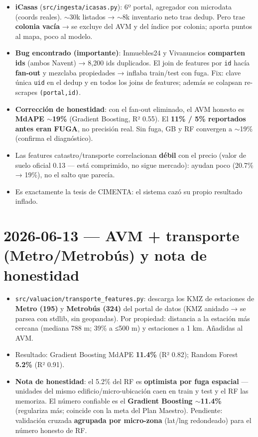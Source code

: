\documentclass[11pt]{article}
\newcommand{\codigo}[1]{\texttt{#1}}
\begin{document}
\begin{itemize}
  \item \textbf{iCasas} (\codigo{src/ingesta/icasas.py}): 6º portal, agregador con
        microdata (coords reales). $\sim$30k listados → $\sim$8k inventario neto
        tras dedup. Pero trae \textbf{colonia vacía} → se excluye del AVM y del
        índice por colonia; aporta puntos al mapa, poco al modelo.
  \item \textbf{Bug encontrado (importante)}: Inmuebles24 y Vivanuncios
        \textbf{comparten ids} (ambos Navent) → 8{,}200 ids duplicados. El join de
        features por \codigo{id} hacía \textbf{fan-out} y mezclaba propiedades →
        inflaba train/test con fuga. Fix: clave única \codigo{uid} en el dedup y en
        todos los joins de features; además se colapsan re-scrapes \codigo{(portal,id)}.
  \item \textbf{Corrección de honestidad}: con el fan-out eliminado, el AVM honesto
        es \textbf{MdAPE $\sim$19\%} (Gradient Boosting, R² 0.55). El \textbf{11\% /
        5\% reportados antes eran FUGA}, no precisión real. Sin fuga, GB y RF
        convergen a $\sim$19\% (confirma el diagnóstico).
  \item Las features catastro/transporte correlacionan \textbf{débil} con el precio
        (valor de suelo oficial 0.13 — está comprimido, no sigue mercado): ayudan
        poco (20.7\% → 19\%), no el salto que parecía.
  \item Es exactamente la tesis de CIMENTA: el sistema cazó su propio resultado
        inflado.
\end{itemize}

\section*{2026-06-13 — AVM + transporte (Metro/Metrobús) y nota de honestidad}

\begin{itemize}
  \item \codigo{src/valuacion/transporte\_features.py}: descarga los KMZ de
        estaciones de \textbf{Metro (195)} y \textbf{Metrobús (324)} del portal de
        datos (KMZ anidado → se parsea con stdlib, sin geopandas). Por propiedad:
        distancia a la estación más cercana (mediana 788 m; 39\% a ≤500 m) y
        estaciones a 1 km. Añadidas al AVM.
  \item Resultado: Gradient Boosting MdAPE \textbf{11.4\%} (R² 0.82); Random Forest
        \textbf{5.2\%} (R² 0.91).
  \item \textbf{Nota de honestidad}: el 5.2\% del RF es \textbf{optimista por fuga
        espacial} — unidades del mismo edificio/micro-ubicación caen en train y
        test y el RF las memoriza. El número confiable es el \textbf{Gradient
        Boosting $\sim$11.4\%} (regulariza más; coincide con la meta del Plan
        Maestro). Pendiente: validación cruzada \textbf{agrupada por micro-zona}
        (lat/lng redondeado) para el número honesto de RF.
\end{itemize}
\end{document}
